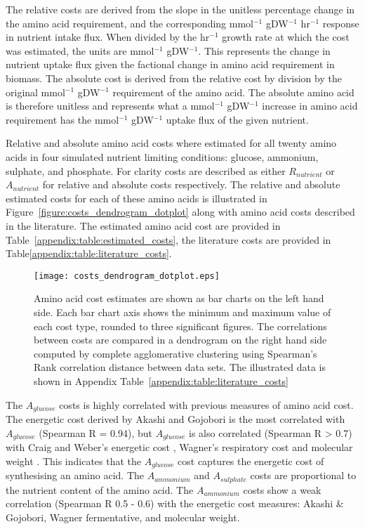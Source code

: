 The relative costs are derived from the slope in the unitless percentage change in the amino acid requirement, and the corresponding mmol$^{-1}$ gDW$^{-1}$ hr$^{-1}$ response in nutrient intake flux. When divided by the hr$^{-1}$ growth rate at which the cost was estimated, the units are mmol$^{-1}$ gDW$^{-1}$. This represents the change in nutrient uptake flux given the factional change in amino acid requirement in biomass. The absolute cost is derived from the relative cost by division by the original mmol$^{-1}$ gDW$^{-1}$ requirement of the amino acid. The absolute amino acid is therefore unitless and represents what a mmol$^{-1}$ gDW$^{-1}$ increase in amino acid requirement has the mmol$^{-1}$ gDW$^{-1}$ uptake flux of the given nutrient.

Relative and absolute amino acid costs where estimated for all twenty amino acids in four simulated nutrient limiting conditions: glucose, ammonium, sulphate, and phosphate. For clarity costs are described as either $R_{nutrient}$ or $A_{nutrient}$ for relative and absolute costs respectively. The relative and absolute estimated costs for each of these amino acids is illustrated in Figure~\vref{figure:costs_dendrogram_dotplot} along with amino acid costs described in the literature. The estimated amino acid cost are provided in Table~\vref{appendix:table:estimated_costs}, the literature costs are provided in Table\vref{appendix:table:literature_costs}.

\begin{sidewaysfigure}
\centering
\texttt{[image: costs\_dendrogram\_dotplot.eps]}
\caption[Comparison of amino acid cost estimates]{Amino acid cost estimates are shown as bar charts on the left hand side. Each bar chart axis shows the minimum and maximum value of each cost type, rounded to three significant figures. The correlations between costs are compared in a dendrogram on the right hand side computed by complete agglomerative clustering using Spearman's Rank correlation distance between data sets. The illustrated data is shown in Appendix Table~\vref{appendix:table:literature_costs}}
\label{figure:costs_dendrogram_dotplot}
\end{sidewaysfigure}

The $A_{glucose}$ costs is highly correlated with previous measures of amino acid cost. The energetic cost derived by Akashi and Gojobori \cite{akashi2002} is the most correlated with $A_{glucose}$ (Spearman R = 0.94), but $A_{glucose}$ is also correlated (Spearman R > 0.7) with Craig and Weber's energetic cost \cite{craig1998}, Wagner's respiratory cost \cite{wagner2005} and molecular weight \cite{seligmann2004}. This indicates that the $A_{glucose}$ cost captures the energetic cost of synthesising an amino acid. The $A_{ammonium}$ and $A_{sulphate}$ costs are proportional to the nutrient content of the amino acid. The $A_{ammonium}$ costs show a weak correlation (Spearman R 0.5 - 0.6) with the energetic cost measures: Akashi \& Gojobori, Wagner fermentative, and molecular weight.

